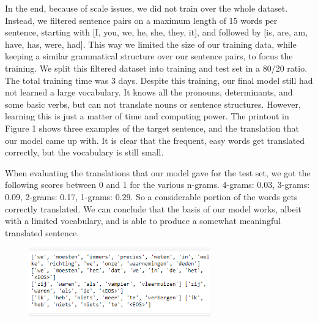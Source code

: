 \documentclass[11pt]{article}
\begin{document}
In the end, because of scale issues, we did not train over the whole dataset. Instead, we filtered sentence pairs on a maximum length of 15 words per sentence, starting with [I, you, we, he, she, they, it], and followed by [is, are, am, have, has, were, had]. This way we limited the size of our training data, while keeping a similar grammatical structure over our sentence pairs, to focus the training. We split this filtered dataset into training and test set in a 80/20 ratio. The total training time was 3 days. Despite this training, our final model still had not learned a large vocabulary. It knows all the pronouns, determinants, and some basic verbs, but can not translate nouns or sentence structures. However, learning this is just a matter of time and computing power. The printout in Figure 1 shows three examples of the target sentence, and the translation that our model came up with. It is clear that the frequent, easy words get translated correctly, but the vocabulary is still small.

When evaluating the translations that our model gave for the test set, we got the following scores between 0 and 1 for the various n-grams. 4-grams: 0.03, 3-grams: 0.09, 2-grams: 0.17, 1-grams: 0.29. So a considerable portion of the words gets correctly translated. We can conclude that the basis of our model works, albeit with a limited vocabulary, and is able to produce a somewhat meaningful translated sentence.

\begin{figure}[h]
    \includegraphics[width=7.8cm]{Screenshot (3).png}
    \label{Figure 1}
\end{figure}
\end{document}

